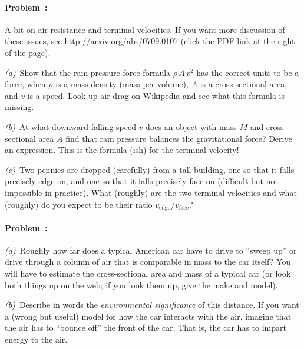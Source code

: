 \documentclass[12pt]{article}
\begin{document}
\paragraph{Problem~\theproblem:}%
A bit on air resistance and terminal velocities. If you want more
discussion of these issues, see \url{http://arxiv.org/abs/0709.0107}
(click the PDF link at the right of the page).

\textsl{(a)}~Show that the ram-pressure-force formula $\rho\,A\,v^2$ has the
correct units to be a force, when $\rho$ is a mass density (mass per volume),
$A$ is a cross-sectional area, and $v$ is a speed. Look up air drag on
Wikipedia and see what this formula is missing.

\textsl{(b)}~At what downward falling speed $v$ does an object with
mass $M$ and cross-sectional area $A$ find that ram pressure balances
the gravitational force? Derive an expression. This is the formula
(ish) for the terminal velocity!

\textsl{(c)}~Two pennies are dropped (carefully) from a tall building,
one so that it falls precisely edge-on, and one so that it falls
precisely face-on (difficult but not impossible in practice).  What
(roughly) are the two terminal velocities and what (roughly) do you expect to be
their ratio $v_{\mathrm{edge}}/v_{\mathrm{face}}$?

\paragraph{Problem~\theproblem:}%
\textsl{(a)}~Roughly how far does a typical American car have to drive
to ``sweep up'' or drive through a column of air that is comparable in
mass to the car itself?  You will have to estimate the
cross-sectional area and mass of a typical car (or look both things
up on the web; if you look them up, give the make and model).

\textsl{(b)}~Describe in words the \emph{environmental significance} of this
distance.
If you want a (wrong but useful) model for how the car interacts with the
air, imagine that the air has to ``bounce off'' the front of the car.
That is, the car has to impart energy to the air.
\end{document}
